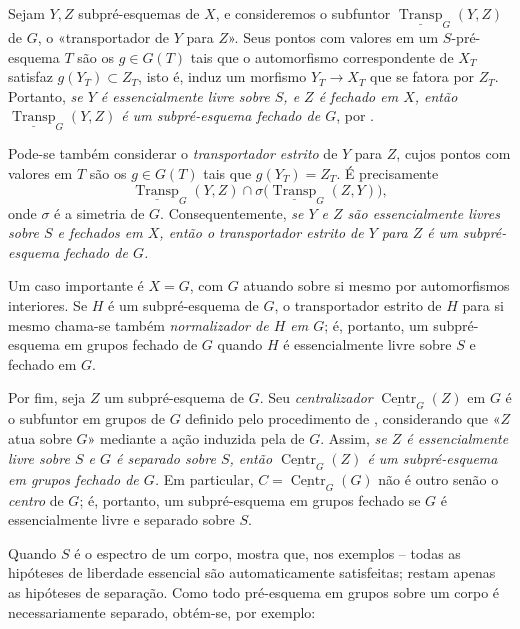 Sejam \(Y,Z\) subpré-esquemas de \(X\), e consideremos o subfuntor
\(\underline{\operatorname{Transp}}_G(Y,Z)\) de \(G\), o «transportador
de \(Y\) para \(Z\)». Seus pontos com valores em um \(S\)-pré-esquema \(T\)
são os \(g\in G(T)\) tais que o automorfismo correspondente de \(X_T\)
satisfaz \(g(Y_T)\subset Z_T\), isto é, induz um morfismo
\(Y_T\to X_T\) que se fatora por \(Z_T\). Portanto, \textit{se \(Y\)
é essencialmente livre sobre \(S\), e \(Z\) é fechado em \(X\), então
\(\underline{\operatorname{Transp}}_G(Y,Z)\) é um subpré-esquema fechado de
\(G\)}, por .

Pode-se também considerar o \emph{transportador estrito} de \(Y\) para
\(Z\), cujos pontos
com valores em \(T\) são os \(g\in G(T)\) tais que \(g(Y_T)=Z_T\). É
precisamente
\[
  \underline{\operatorname{Transp}}_G(Y,Z)
  \cap
  \sigma\bigl(\underline{\operatorname{Transp}}_G(Z,Y)\bigr),
\]
onde \(\sigma\) é a simetria de \(G\). Consequentemente, \textit{se \(Y\) e
\(Z\) são essencialmente livres sobre \(S\) e fechados em \(X\), então
o transportador estrito de \(Y\) para \(Z\) é um subpré-esquema fechado de
\(G\).}

Um caso importante é \(X=G\), com \(G\) atuando sobre si mesmo por
automorfismos interiores. Se \(H\) é um subpré-esquema de \(G\), o
transportador estrito de \(H\) para si mesmo chama-se também
\emph{normalizador de \(H\) em \(G\)}; é, portanto, um subpré-esquema
em grupos fechado de \(G\) quando \(H\) é essencialmente livre sobre
\(S\) e fechado em \(G\).

Por fim, seja \(Z\) um subpré-esquema de \(G\). Seu
\emph{centralizador} \(\underline{\operatorname{Centr}}_G(Z)\) em \(G\)
é o subfuntor em grupos de \(G\) definido pelo procedimento de
, considerando que «\(Z\)
atua sobre \(G\)» mediante a ação induzida pela de \(G\). Assim,
\textit{se \(Z\) é essencialmente livre sobre \(S\) e \(G\) é separado
sobre \(S\), então \(\underline{\operatorname{Centr}}_G(Z)\) é um
subpré-esquema em grupos fechado de \(G\).} Em particular, \(C=\underline{\operatorname{Centr}}_G(G)\) não é outro
senão o \emph{centro} de \(G\); é, portanto, um subpré-esquema em grupos
fechado se \(G\) é essencialmente livre e separado sobre \(S\).

Quando \(S\) é o espectro de um corpo,
 mostra que, nos exemplos
--
todas as hipóteses de liberdade essencial são automaticamente satisfeitas;
restam apenas as hipóteses de separação. Como todo pré-esquema em
grupos sobre um corpo é necessariamente separado, obtém-se, por exemplo:

